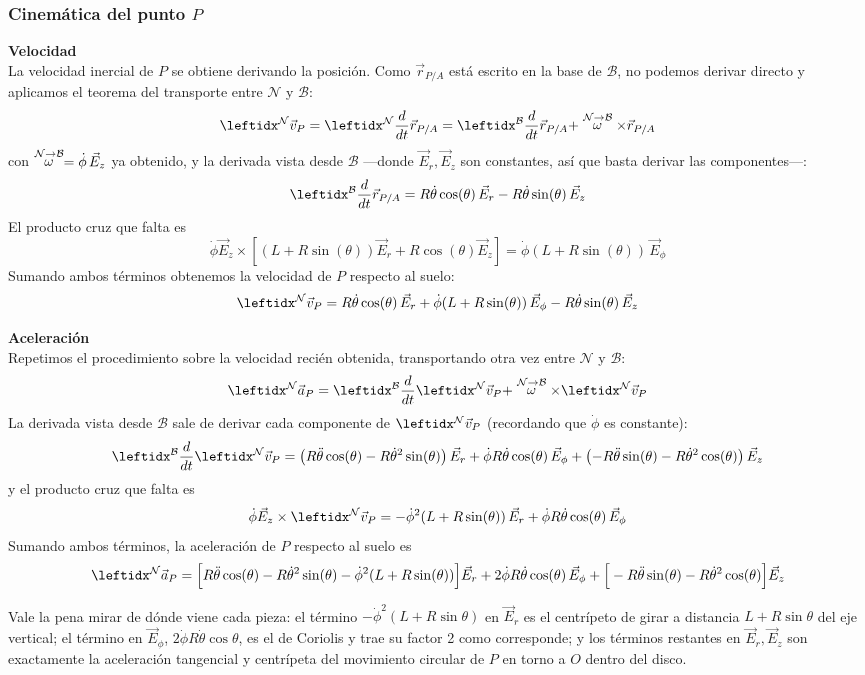 \begin{tcolorbox}[%
        title= Solucion Disco en barra rotatoria vertical, breakable]
\subsubsection*{Cinemática del punto $P$}

\textbf{Velocidad}\\
La velocidad inercial de $P$ se obtiene derivando la posición. Como $\vec{r}_{P/A}$ está escrito
en la base de $\mathcal{B}$, no podemos derivar directo y aplicamos el teorema del transporte
entre $\mathcal{N}$ y $\mathcal{B}$:
$$\marc{\vec{v}_P}{N}=\der{\vec{r}_{P/A}}{N}=\transporta{\vec{r}_{P/A}}{N}{B}$$
con $\stackrel{\mathcal{N} \to \mathcal{B}}{\omega}=\dot\phi\,\vec{E}_z$ ya obtenido, y la derivada vista desde $\mathcal{B}$ —donde
$\vec{E}_r,\vec{E}_z$ son constantes, así que basta derivar las componentes—:
$$\der{\vec{r}_{P/A}}{B}=R\dot\theta\cos(\theta)\,\vec{E}_r-R\dot\theta\sin(\theta)\,\vec{E}_z$$
El producto cruz que falta es
$$\dot\phi\vec{E}_z\times\left[(L+R\sin(\theta))\vec{E}_r+R\cos(\theta)\vec{E}_z\right]=\dot\phi(L+R\sin(\theta))\,\vec{E}_\phi$$
Sumando ambos términos obtenemos la velocidad de $P$ respecto al suelo:
$$\marc{\vec{v}_P}{N}=R\dot\theta\cos(\theta)\,\vec{E}_r+\dot\phi(L+R\sin(\theta))\,\vec{E}_\phi-R\dot\theta\sin(\theta)\,\vec{E}_z$$

\textbf{Aceleración}\\
Repetimos el procedimiento sobre la velocidad recién obtenida, transportando otra vez entre
$\mathcal{N}$ y $\mathcal{B}$:
$$\marc{\vec{a}_P}{N}=\transporta{\marc{\vec{v}_P}{N}{}}{N}{B}$$
La derivada vista desde $\mathcal{B}$ sale de derivar cada componente de $\marc{\vec{v}_P}{N}{}$
(recordando que $\dot\phi$ es constante):
$$\der{}{B}\marc{\vec{v}_P}{N}{}=\left(R\ddot\theta\cos(\theta)-R\dot\theta^2\sin(\theta)\right)\vec{E}_r+\dot\phi R\dot\theta\cos(\theta)\,\vec{E}_\phi+\left(-R\ddot\theta\sin(\theta)-R\dot\theta^2\cos(\theta)\right)\vec{E}_z$$
y el producto cruz que falta es
$$\dot\phi\vec{E}_z\times\marc{\vec{v}_P}{N}{}=-\dot\phi^2(L+R\sin(\theta))\,\vec{E}_r+\dot\phi R\dot\theta\cos(\theta)\,\vec{E}_\phi$$
Sumando ambos términos, la aceleración de $P$ respecto al suelo es
$$\marc{\vec{a}_P}{N}=\Big[R\ddot\theta\cos(\theta)-R\dot\theta^2\sin(\theta)-\dot\phi^2(L+R\sin(\theta))\Big]\vec{E}_r+2\dot\phi R\dot\theta\cos(\theta)\,\vec{E}_\phi+\Big[-R\ddot\theta\sin(\theta)-R\dot\theta^2\cos(\theta)\Big]\vec{E}_z$$

Vale la pena mirar de dónde viene cada pieza: el término $-\dot\phi^2(L+R\sin\theta)$ en
$\vec{E}_r$ es el centrípeto de girar a distancia $L+R\sin\theta$ del eje vertical; el término en
$\vec{E}_\phi$, $2\dot\phi R\dot\theta\cos\theta$, es el de Coriolis y trae su factor 2 como
corresponde; y los términos restantes en $\vec{E}_r,\vec{E}_z$ son exactamente la aceleración
tangencial y centrípeta del movimiento circular de $P$ en torno a $O$ dentro del disco.

\end{tcolorbox}
\fi
